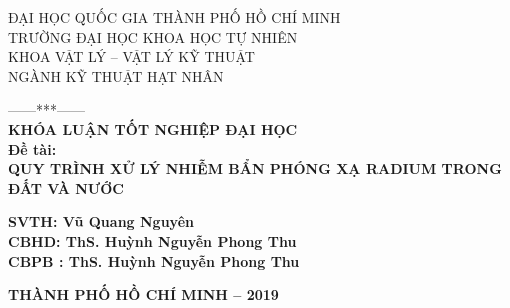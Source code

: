 

\newcommand\nbvspace[1][3]{\vspace*{\stretch{#1}}}
\newcommand\nbstretchyspace{\spaceskip0.5em plus 0.25em minus 0.25em}
\newcommand{\nbtitlestretch}{}
\pagestyle{empty}


\begin{center}
{\nbtitlestretch\normalsize
ĐẠI HỌC QUỐC GIA THÀNH PHỐ HỒ CHÍ MINH\\
TRƯỜNG ĐẠI HỌC KHOA HỌC TỰ NHIÊN\\
KHOA VẬT LÝ – VẬT LÝ KỸ THUẬT\\
NGÀNH KỸ THUẬT HẠT NHÂN}

\nbvspace[1]
------***------\\[1cm]
\bfseries
\normalsize
\nbvspace[1]
\large KHÓA LUẬN TỐT NGHIỆP ĐẠI HỌC\\[4cm]
\normalsize Đề tài:\\
\large QUY TRÌNH XỬ LÝ NHIỄM BẨN PHÓNG XẠ RADIUM TRONG ĐẤT VÀ NƯỚC

\nbvspace[2]




\nbvspace[3]
  \bfseries
  \normalsize
\hspace*{5cm}  SVTH: Vũ Quang Nguyên\\
\hspace*{5cm}  CBHD: ThS. Huỳnh Nguyễn Phong Thu\\
\hspace*{5cm}  CBPB : ThS. Huỳnh Nguyễn Phong Thu
\nbvspace[2]



  \bfseries
  \nbvspace[3]
  \nbvspace[2]
  \nbvspace[4]
  \normalsize
  THÀNH PHỐ HỒ CHÍ MINH – 2019
  
\end{center}

 
\blankpage
